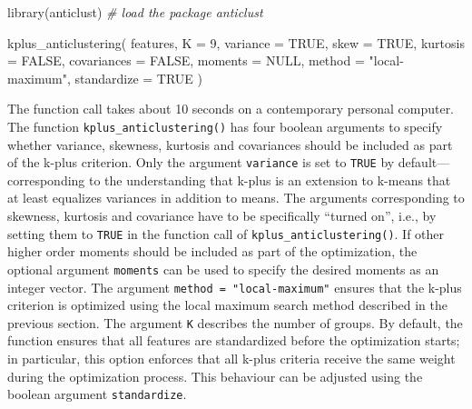 \documentclass[
  man,floatsintext]{apa7}
\newenvironment{Shaded}{\begin{snugshade}}{\end{snugshade}}
\newcommand{\AttributeTok}[1]{\textcolor[rgb]{0.77,0.63,0.00}{#1}}
\newcommand{\CommentTok}[1]{\textcolor[rgb]{0.56,0.35,0.01}{\textit{#1}}}
\newcommand{\ConstantTok}[1]{\textcolor[rgb]{0.00,0.00,0.00}{#1}}
\newcommand{\DecValTok}[1]{\textcolor[rgb]{0.00,0.00,0.81}{#1}}
\newcommand{\FunctionTok}[1]{\textcolor[rgb]{0.00,0.00,0.00}{#1}}
\newcommand{\NormalTok}[1]{#1}
\newcommand{\StringTok}[1]{\textcolor[rgb]{0.31,0.60,0.02}{#1}}
\begin{document}
\begin{Shaded}
\begin{Highlighting}[]
\FunctionTok{library}\NormalTok{(anticlust) }\CommentTok{\# load the package anticlust}

\FunctionTok{kplus\_anticlustering}\NormalTok{(}
\NormalTok{  features,}
  \AttributeTok{K =} \DecValTok{9}\NormalTok{,}
  \AttributeTok{variance =} \ConstantTok{TRUE}\NormalTok{,}
  \AttributeTok{skew =} \ConstantTok{TRUE}\NormalTok{,}
  \AttributeTok{kurtosis =} \ConstantTok{FALSE}\NormalTok{,}
  \AttributeTok{covariances =} \ConstantTok{FALSE}\NormalTok{,}
  \AttributeTok{moments =} \ConstantTok{NULL}\NormalTok{,}
  \AttributeTok{method =} \StringTok{"local{-}maximum"}\NormalTok{,}
  \AttributeTok{standardize =} \ConstantTok{TRUE}
\NormalTok{)}
\end{Highlighting}
\end{Shaded}

The function call takes about 10 seconds on a contemporary personal computer. The function \texttt{kplus\_anticlustering()} has four boolean arguments to specify whether variance, skewness, kurtosis and covariances should be included as part of the k-plus criterion. Only the argument \texttt{variance} is set to \texttt{TRUE} by default---corresponding to the understanding that k-plus is an extension to k-means that at least equalizes variances in addition to means. The arguments corresponding to skewness, kurtosis and covariance have to be specifically ``turned on'', i.e., by setting them to \texttt{TRUE} in the function call of \texttt{kplus\_anticlustering()}. If other higher order moments should be included as part of the optimization, the optional argument \texttt{moments} can be used to specify the desired moments as an integer vector. The argument \texttt{method\ =\ "local-maximum"} ensures that the k-plus criterion is optimized using the local maximum search method described in the previous section. The argument \texttt{K} describes the number of groups. By default, the function ensures that all features are standardized before the optimization starts; in particular, this option enforces that all k-plus criteria receive the same weight during the optimization process. This behaviour can be adjusted using the boolean argument \texttt{standardize}.
\end{document}
